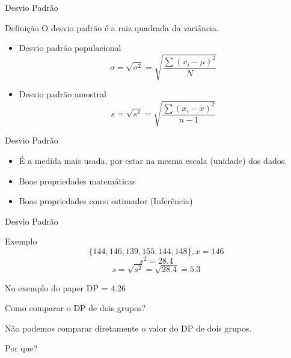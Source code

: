 \documentclass{beamer}
\begin{document}
\begin{frame}{\scriptsize Desvio Padrão}
  \begin{block}{Definição}
    O desvio padrão é a raiz quadrada da variância.
  \end{block}
  \begin{itemize}
    \footnotesize
  \item Desvio padrão populacional
    $$ \sigma = \sqrt{ \sigma^2 } = \sqrt{ \frac{\sum (x_i - \mu)^2}{N} } $$
  \item Desvio padrão amostral
    $$ s = \sqrt{s^2 } = \sqrt{ \frac{\sum (x_i - \bar{x})^2}{n-1} } $$
  \end{itemize}
\end{frame}

\begin{frame}{\scriptsize Desvio Padrão}
  \begin{itemize}
    \footnotesize
  \item É a medida mais usada, por estar na mesma escala (unidade) dos
    dados.
  \item Boas propriedades matemáticas
  \item Boas propriedades como estimador (Inferência)
  \end{itemize}
\end{frame}

\begin{frame}{\scriptsize Desvio Padrão}
  \begin{exampleblock}{Exemplo}
    \scriptsize
      \begin{displaymath}
        \{144, 146, 139, 155, 144, 148\}, \bar{x} = 146
      \end{displaymath}
      \medskip
      \begin{displaymath}
        s^2 = 28.4
      \end{displaymath}
      \medskip
      \begin{displaymath}
        s = \sqrt{s^2} = \sqrt{28.4} = 5.3
    \end{displaymath}
  \end{exampleblock}
  \begin{block}{No exemplo do paper}
    \footnotesize
    DP = 4.26
  \end{block}
\end{frame}

\begin{frame}{\scriptsize Como comparar o DP de dois grupos?}
  \begin{block}{}
    \footnotesize
    Não podemos comparar diretamente o \alert{valor} do DP de dois grupos.

    \bigskip
    Por que?
  \end{block}
\end{frame}
\end{document}
